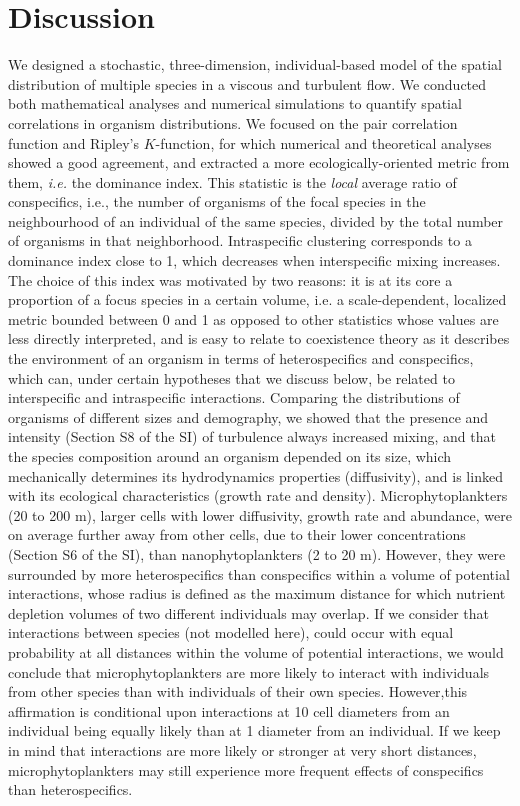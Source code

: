 \documentclass[english]{article}
\begin{document}
\section*{Discussion}

We designed a stochastic, three-dimension, individual-based model
of the spatial distribution of multiple species in a viscous and turbulent
flow. We conducted both mathematical analyses and numerical simulations
to quantify spatial correlations in organism distributions. We focused
on the pair correlation function and Ripley's $K$-function, for which
numerical and theoretical analyses showed a good agreement, and extracted
a more ecologically-oriented metric from them, \textit{i.e.} the dominance
index. This statistic is the \textit{local} average ratio of conspecifics,
i.e., the number of organisms of the focal species in the neighbourhood
of an individual of the same species, divided by the total number
of organisms in that neighborhood. Intraspecific clustering corresponds
to a dominance index close to 1, which decreases when interspecific
mixing increases. The choice of this index was motivated by two reasons:
it is at its core a proportion of a focus species in a certain volume,
i.e. a scale-dependent, localized metric bounded between 0 and 1 as
opposed to other statistics whose values are less directly interpreted,
and is easy to relate to coexistence theory as it describes the environment
of an organism in terms of heterospecifics and conspecifics, which
can, under certain hypotheses that we discuss below, be related to
interspecific and intraspecific interactions. Comparing the distributions
of organisms of different sizes and demography, we showed that the
presence and intensity (Section S8 of the SI) of turbulence always
increased mixing, and that the species composition around an organism
depended on its size, which mechanically determines its hydrodynamics
properties (diffusivity), and is linked with its ecological characteristics
(growth rate and density). Microphytoplankters (20 to 200 \textmu
m), larger cells with lower diffusivity, growth rate and abundance,
were on average further away from other cells, due to their lower
concentrations (Section S6 of the SI), than nanophytoplankters (2
to 20 \textmu m). However, they were surrounded by more heterospecifics
than conspecifics within a volume of potential interactions, whose
radius is defined as the maximum distance for which nutrient depletion
volumes of two different individuals may overlap. If we consider that
interactions between species (not modelled here), could occur with
equal probability at all distances within the volume of potential
interactions, we would conclude that microphytoplankters are more
likely to interact with individuals from other species than with individuals
of their own species. However,this affirmation is conditional upon
interactions at 10 cell diameters from an individual being equally
likely than at 1 diameter from an individual. If we keep in mind that
interactions are more likely or stronger at very short distances,
microphytoplankters may still experience more frequent effects of
conspecifics than heterospecifics.
\end{document}
